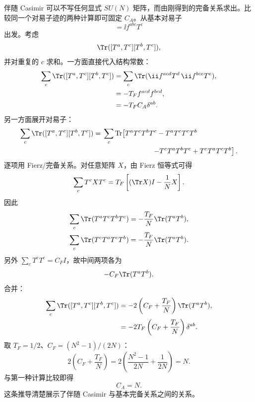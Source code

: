 \begin{derivation}



伴随 Casimir 可以不写任何显式 $SU(N)$ 矩阵，而由刚得到的完备关系求出。比较同一个对易子迹的两种计算即可固定 $C_A$。从基本对易子
\begin{equation*}
 [T^a,T^b]=\ii f^{abc}T^c
\end{equation*}
出发。考虑
\begin{equation*}
 \Tr([T^a,T^c][T^b,T^c]),
\end{equation*}
并对重复的 $c$ 求和。一方面直接代入结构常数：
\begin{align*}
 \sum_c\Tr([T^a,T^c][T^b,T^c])
 &=\sum_c\Tr(\ii f^{acd}T^d\,\ii f^{bce}T^e),\\
 &=-T_F f^{acd}f^{bcd},\\
 &=-T_F C_A\delta^{ab}.
\end{align*}
另一方面展开对易子：
\begin{align*}
 \sum_c\Tr([T^a,T^c][T^b,T^c])
 ={}&\sum_c\operatorname{Tr}\!\left[
 T^aT^cT^bT^c-T^aT^cT^cT^b\right.\\
 &\left.\hspace{2.5cm}-T^cT^aT^bT^c+T^cT^aT^cT^b
 \right].
\end{align*}
逐项用 Fierz/完备关系。对任意矩阵 $X$，由 Fierz 恒等式可得
\begin{equation*}
 \sum_c T^cXT^c
 =T_F\left[(\Tr X)I-\frac1N X\right].
\end{equation*}
因此
\begin{align*}
 \sum_c\Tr(T^aT^cT^bT^c)
 &=-\frac{T_F}{N}\Tr(T^aT^b),\\
 \sum_c\Tr(T^cT^aT^cT^b)
 &=-\frac{T_F}{N}\Tr(T^aT^b).
\end{align*}
另外 $\sum_cT^cT^c=C_FI$，故中间两项各为
\begin{equation*}
 -C_F\Tr(T^aT^b).
\end{equation*}
合并：
\begin{align*}
 \sum_c\Tr([T^a,T^c][T^b,T^c])
 &=-2\left(C_F+\frac{T_F}{N}\right)
 \Tr(T^aT^b),\\
 &=-2T_F\left(C_F+\frac{T_F}{N}\right)\delta^{ab}.
\end{align*}
取 $T_F=1/2$、$C_F=(N^2-1)/(2N)$：
\begin{equation*}
 2\left(C_F+\frac{T_F}{N}\right)
 =2\left(\frac{N^2-1}{2N}+\frac1{2N}\right)=N.
\end{equation*}
与第一种计算比较即得
\begin{equation*}
 C_A=N.
\end{equation*}
这条推导清楚展示了伴随 Casimir 与基本完备关系之间的关系。
\end{derivation}





















